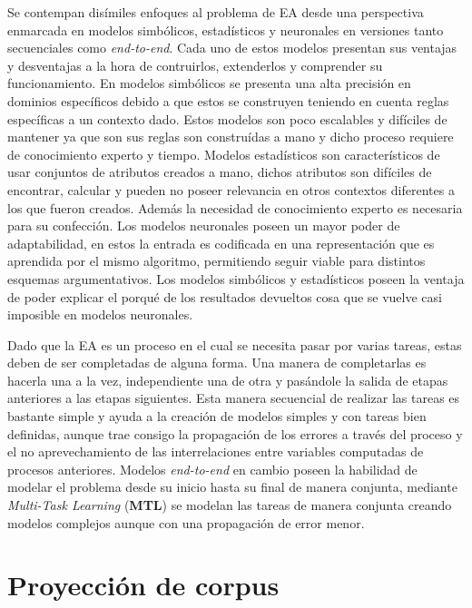 Se contempan disímiles enfoques al problema de EA desde una perspectiva enmarcada en modelos 
simbólicos, estadísticos y neuronales en versiones tanto secuenciales como \emph{end-to-end}. 
Cada uno de estos modelos presentan sus ventajas y desventajas a la hora de contruirlos, 
extenderlos y comprender su funcionamiento. En modelos simbólicos se presenta una alta
precisión en dominios específicos debido a que estos se construyen teniendo en cuenta reglas específicas a un
contexto dado. Estos modelos son poco escalables y difíciles de mantener ya que son sus reglas son construídas
a mano y dicho proceso requiere de conocimiento experto y tiempo. Modelos estadísticos son
característicos de usar conjuntos de atributos creados a mano, dichos atributos son difíciles
de encontrar, calcular y pueden no poseer relevancia en otros contextos diferentes a los que fueron creados. 
Además la necesidad de conocimiento experto es necesaria para su confección. Los modelos neuronales poseen
un mayor poder de adaptabilidad, en estos la entrada es codificada en una representación que es aprendida por
el mismo algoritmo, permitiendo seguir viable para distintos esquemas argumentativos. Los modelos simbólicos y 
estadísticos poseen la ventaja de poder explicar el porqué de los resultados devueltos cosa que se vuelve casi
imposible en modelos neuronales.

Dado que la EA es un proceso en el cual se necesita pasar por varias tareas, estas deben de ser completadas
de alguna forma. Una manera de completarlas es hacerla una a la vez, independiente una de otra y pasándole
la salida de etapas anteriores a las etapas siguientes. Esta manera secuencial de realizar las 
tareas es bastante simple y ayuda a la creación de modelos simples y con tareas bien definidas, aunque trae consigo 
la propagación de los errores a través del proceso y el no aprevechamiento de las interrelaciones entre variables 
computadas de procesos anteriores. Modelos \emph{end-to-end} en cambio poseen la habilidad de modelar el problema 
desde su inicio hasta su final de manera conjunta, mediante \emph{Multi-Task Learning} (\textbf{MTL}) se modelan
las tareas de manera conjunta creando modelos complejos aunque con una propagación de error menor.


\section{Proyección de corpus}

